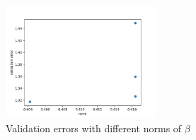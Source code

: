\begin{answer}
    \begin{figure}[H]
        \centering
        \includegraphics[width=0.5\textwidth]{../src/implicitreg/implicitreg_linear.png}
        \caption{Validation errors with different norms of $\beta$}
        \label{fig:03-linear-coding-sol}
    \end{figure}
\end{answer}